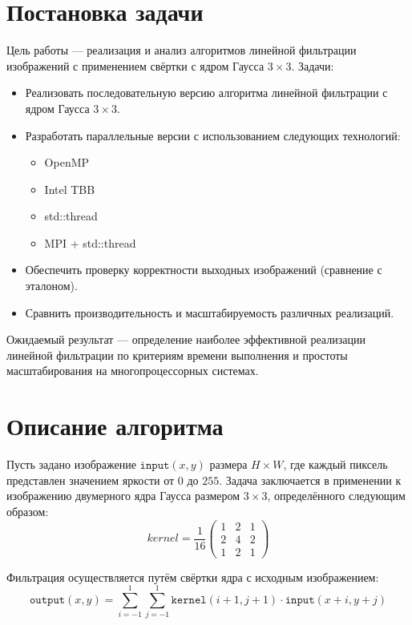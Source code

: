 \documentclass[12pt]{article}
\begin{document}
\section{Постановка задачи}

Цель работы — реализация и анализ алгоритмов линейной фильтрации изображений с применением свёртки с ядром Гаусса $3 \times 3$.
Задачи:
\begin{itemize}
	\item Реализовать последовательную версию алгоритма линейной фильтрации с ядром Гаусса $3 \times 3$.
	\item Разработать параллельные версии с использованием следующих технологий:
	\begin{itemize}
		\item OpenMP
		\item Intel TBB
		\item std::thread
		\item MPI + std::thread
	\end{itemize}
	\item Обеспечить проверку корректности выходных изображений (сравнение с эталоном).
	\item Сравнить производительность и масштабируемость различных реализаций.
\end{itemize}

Ожидаемый результат --- определение наиболее эффективной реализации линейной фильтрации по критериям времени выполнения и простоты масштабирования на многопроцессорных системах.

\section{Описание алгоритма}

Пусть задано изображение $\texttt{input}(x, y)$ размера $H \times W$, где каждый пиксель представлен значением яркости от $0$ до $255$. Задача заключается в применении к изображению двумерного ядра Гаусса размером $3 \times 3$, определённого следующим образом:
\[
kernel = \frac{1}{16}
\begin{pmatrix}
	1 & 2 & 1 \\
	2 & 4 & 2 \\
	1 & 2 & 1
\end{pmatrix}
\]

Фильтрация осуществляется путём свёртки ядра с исходным изображением:
\[
\texttt{output}(x, y) = \sum_{i=-1}^{1} \sum_{j=-1}^{1} \texttt{kernel}(i+1, j+1) \cdot \texttt{input}(x+i, y+j)
\]
\end{document}
